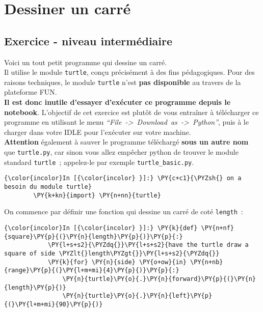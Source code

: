     \hypertarget{dessiner-un-carruxe9}{%
\section{Dessiner un carré}\label{dessiner-un-carruxe9}}

    \hypertarget{exercice---niveau-intermuxe9diaire}{%
\subsection{Exercice - niveau
intermédiaire}\label{exercice---niveau-intermuxe9diaire}}

    Voici un tout petit programme qui dessine un carré.\\

    Il utilise le module \texttt{turtle}, conçu précisément à des fins
pédagogiques. Pour des raisons techniques, le module \texttt{turtle}
n'est \textbf{pas disponible} au travers de la plateforme FUN.\\

    \textbf{Il est donc inutile d'essayer d'exécuter ce programme depuis le
notebook}. L'objectif de cet exercice est plutôt de vous entraîner à
télécharger ce programme en utilisant le menu
\emph{``File~-\textgreater{}~Download~as~-\textgreater{}~Python''}, puis
à le charger dans votre IDLE pour l'exécuter sur votre machine.\\

    \textbf{Attention} également à sauver le programme téléchargé
\textbf{sous un autre nom} que \texttt{turtle.py}, car sinon vous allez
empêcher python de trouver le module standard \texttt{turtle}~;
appelez-le par exemple \texttt{turtle\_basic.py}.

    \begin{Verbatim}[commandchars=\\\{\}]
{\color{incolor}In [{\color{incolor} }]:} \PY{c+c1}{\PYZsh{} on a besoin du module turtle}
        \PY{k+kn}{import} \PY{n+nn}{turtle}
\end{Verbatim}


    On commence par définir une fonction qui dessine un carré de coté
\texttt{length}~:

    \begin{Verbatim}[commandchars=\\\{\}]
{\color{incolor}In [{\color{incolor} }]:} \PY{k}{def} \PY{n+nf}{square}\PY{p}{(}\PY{n}{length}\PY{p}{)}\PY{p}{:}
            \PY{l+s+s2}{\PYZdq{}}\PY{l+s+s2}{have the turtle draw a square of side \PYZlt{}length\PYZgt{}}\PY{l+s+s2}{\PYZdq{}}
            \PY{k}{for} \PY{n}{side} \PY{o+ow}{in} \PY{n+nb}{range}\PY{p}{(}\PY{l+m+mi}{4}\PY{p}{)}\PY{p}{:}
                \PY{n}{turtle}\PY{o}{.}\PY{n}{forward}\PY{p}{(}\PY{n}{length}\PY{p}{)}
                \PY{n}{turtle}\PY{o}{.}\PY{n}{left}\PY{p}{(}\PY{l+m+mi}{90}\PY{p}{)}
\end{Verbatim}


